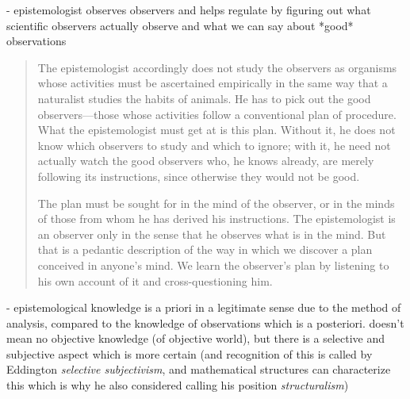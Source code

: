 - epistemologist observes observers and helps regulate by figuring out what scientific observers actually observe and what we can say about *good* observations

\begin{quote}
    The epistemologist accordingly does not study the observers as organisms whose activities must be ascertained empirically in the same way that a naturalist studies the habits of animals.  He has to pick out the good observers---those whose activities follow a conventional plan of procedure.  What the epistemologist must get at is this plan.  Without it, he does not know which observers to study and which to ignore; with it, he need not actually watch the good observers who, he knows already, are merely following its instructions, since otherwise they would not be good.  
    
    The plan must be sought for in the mind of the observer, or in the minds of those from whom he has derived his instructions.  The epistemologist is an observer only in the sense that he observes what is in the mind.  But that is a pedantic description of the way in which we discover a plan conceived in anyone's mind.  We learn the observer's plan by listening to his own account of it and cross-questioning him.
    
    \citep[p. 23]{Eddington1939}
\end{quote}

- epistemological knowledge is a priori in a legitimate sense due to the method of analysis, compared to the knowledge of observations which is a posteriori.  doesn't mean no objective knowledge (of objective world), but there is a selective and subjective aspect which is more certain (and recognition of this is called by Eddington \emph{selective subjectivism}, and mathematical structures can characterize this which is why he also considered calling his position \emph{structuralism})

